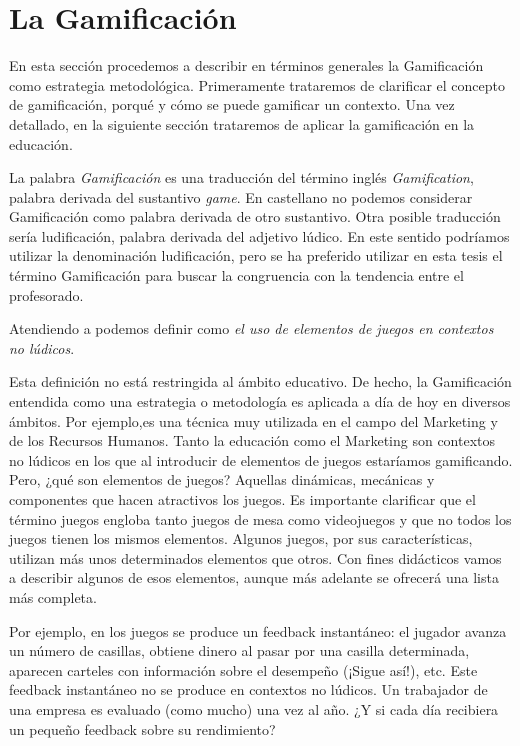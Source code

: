 
\section{La Gamificación}



En esta sección procedemos a describir en términos generales la Gamificación como estrategia metodológica.
%
Primeramente trataremos de clarificar el concepto de gamificación, porqué y cómo se puede gamificar un contexto.
%
Una vez detallado, en la siguiente sección trataremos de aplicar la gamificación en la educación.


La palabra \textit{Gamificación} es una traducción del término inglés \textit{Gamification}, palabra derivada del sustantivo \textit{game}.
%
En castellano no podemos considerar Gamificación como palabra derivada de otro sustantivo. 
%
Otra posible traducción sería ludificación, palabra derivada del adjetivo lúdico.
%
En este sentido podríamos utilizar la denominación ludificación, pero se ha preferido utilizar en esta tesis el término Gamificación para buscar la congruencia con la tendencia entre el profesorado.




Atendiendo a \cite{GamificationDef} podemos definir  como \textit{el uso de elementos de juegos en contextos no lúdicos}. 

Esta definición no está restringida al ámbito educativo. 
%
De hecho, la Gamificación entendida como una estrategia o metodología es aplicada a día de hoy en diversos ámbitos. 
%
Por ejemplo,es una técnica muy utilizada en el campo del Marketing y de los Recursos Humanos.
%
Tanto la educación como el Marketing son contextos no lúdicos en los que al introducir de elementos de juegos estaríamos gamificando. 
%
Pero, ¿qué son elementos de juegos? 
%
Aquellas dinámicas, mecánicas y componentes que hacen atractivos los juegos.
%
Es importante clarificar que el término juegos engloba tanto juegos de mesa como videojuegos y que no todos los juegos tienen los mismos elementos.
%
Algunos juegos, por sus características, utilizan más unos determinados elementos que otros.
%
Con fines didácticos vamos a describir algunos de esos elementos, aunque más adelante se ofrecerá una lista más completa.

Por ejemplo, en los juegos se produce un feedback instantáneo: el jugador avanza un número de casillas, obtiene dinero al pasar por una casilla determinada, aparecen carteles con información sobre el desempeño (¡Sigue así!), etc.
%
Este feedback instantáneo no se produce en contextos no lúdicos.
%
Un trabajador de una empresa es evaluado (como mucho) una vez al año. 
%
¿Y si cada día recibiera un pequeño feedback sobre su rendimiento?


